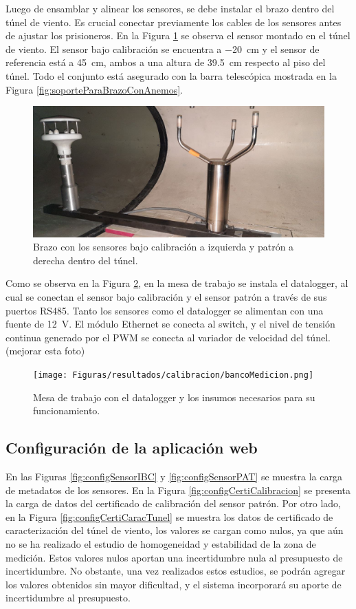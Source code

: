 Luego de ensamblar y alinear los sensores, se debe instalar el brazo dentro del túnel de viento. Es crucial conectar previamente los cables de los sensores antes de ajustar los prisioneros. En la Figura \ref{fig:deltaMontajeTunel} se observa el sensor montado en el túnel de viento. El sensor bajo calibración se encuentra a \SI{-20}{\centi\meter} y el sensor de referencia está a \SI{45}{\centi\meter}, ambos a una altura de \SI{39.5}{\centi\meter} respecto al piso del túnel. Todo el conjunto está asegurado con la barra telescópica mostrada en la Figura \ref{fig:soporteParaBrazoConAnemos}.


\begin{figure}[H]
    \centering
    \includegraphics[width=0.7\linewidth]{Figuras/resultados/calibracion/HD51_3/deltaMontajeTunel.jpg}
    \caption{Brazo con los sensores bajo calibración a izquierda y patrón a derecha dentro del túnel.}
    \label{fig:deltaMontajeTunel}
\end{figure}

Como se observa en la Figura \ref{fig:datalogger3}, en la mesa de trabajo se instala el datalogger, al cual se conectan el sensor bajo calibración y el sensor patrón a través de sus puertos RS485. Tanto los sensores como el datalogger se alimentan con una fuente de \SI{12}{\volt}. El módulo Ethernet se conecta al switch, y el nivel de tensión continua generado por el PWM se conecta al variador de velocidad del túnel.
(mejorar esta foto)
\begin{figure}[H]
    \centering
    \texttt{[image: Figuras/resultados/calibracion/bancoMedicion.png]}
    \caption{Mesa de trabajo con el datalogger y los insumos necesarios para su funcionamiento.}
    \label{fig:datalogger3}
\end{figure}

\subsection{Configuración de la aplicación web}

En las Figuras \ref{fig:configSensorIBC} y \ref{fig:configSensorPAT} se muestra la carga de metadatos de los sensores. En la Figura \ref{fig:configCertiCalibracion} se presenta la carga de datos del certificado de calibración del sensor patrón. Por otro lado, en la Figura \ref{fig:configCertiCaracTunel} se muestra los datos de certificado de caracterización del túnel de viento, los valores se cargan como nulos, ya que aún no se ha realizado el estudio de homogeneidad y estabilidad de la zona de medición. Estos valores nulos aportan una incertidumbre nula al presupuesto de incertidumbre. No obstante, una vez realizados estos estudios, se podrán agregar los valores obtenidos sin mayor dificultad, y el sistema incorporará su aporte de incertidumbre al presupuesto.


